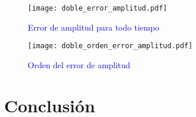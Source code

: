 \documentclass[aps,prb,twocolumn,superscriptaddress,floatfix,longbibliography]{revtex4-2}
\newcounter{para}
\begin{document}
\begin{figure}[h]
  \texttt{[image: doble\_error\_amplitud.pdf]}
  \caption{\textcolor{blue}{Error de amplitud para todo tiempo}}
   \label{fig:doble_error_amplitud.pdf}
\end{figure}

\begin{figure}[h]
  \texttt{[image: doble\_orden\_error\_amplitud.pdf]}
  \caption{\textcolor{blue}{Orden del error de amplitud}}
   \label{fig:doble_orden_error_amplitud}
\end{figure}


\section{Conclusión}





\end{document}
